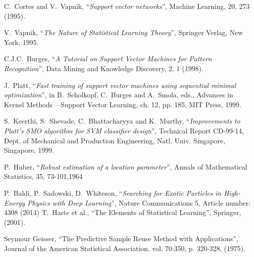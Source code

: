 \begin{thebibliography}{99}
  C.~Cortes and V.~Vapnik, 
                       ``{\em Support vector networks}'', 
                       Machine Learning, 20, 273 (1995). 

  V.~Vapnik, ``{\em The Nature of Statistical Learning Theory}'', 
                       Springer Verlag, New York, 1995.

       C.J.C.~Burges, 
                       ``{\em A Tutorial on Support Vector Machines for Pattern Recognition}'', 
                       Data Mining and Knowledge Discovery, 2, 1 (1998).

        J.~Platt,
                       ``{\em Fast training of support vector machines using sequential 
                       minimal optimization}'', 
                       in B.~Scholkopf, C.~Burges and A.~Smola, eds., 
                       Advances in Kernel Methods -- Support Vector Learning, 
                       ch. 12, pp. 185, MIT Press, 1999.

      S.~Keerthi, S.~Shevade, C.~Bhattacharyya and K.~Murthy, 
                       ``{\em Improvements to Platt's SMO algorithm for SVM classifier 
                       design}'', 
                       Technical Report CD-99-14, Dept. of Mechanical and Production Engineering, 
                       Natl. Univ. Singapore, Singapore, 1999.

	      P.~Huber,
                        ``{\em Robust estimation of a location parameter}'',
                        Annals of Mathematical Statistics, 35, 73-101,1964

     P.~Baldi, P.~Sadowski, D.~Whiteson,
                        ``{\em Searching for Exotic Particles in High-Energy Physics 
                         with Deep Learning}'', Nature Communications 5,
                        Article number: 4308 (2014)
     T.~Haste et al.,
                        ``The Elements of Statistical Learning'',
                        Springer, (2001).

     Seymour Geisser,
                        ``The Predictive Sample Reuse Method with Applications'',
                        Journal of the American Statistical Association,
                        vol. 70:350, p. 320-328, (1975).


\end{thebibliography}
